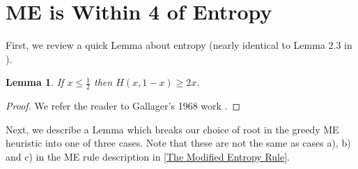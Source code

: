 \documentclass[letterpaper,12pt,titlepage,oneside,final]{book}
\theoremstyle{plain}
\newtheorem{lem}[thm]{Lemma}
\begin{document}
\section{ME is Within 4 of Entropy}

First, we review a quick Lemma about entropy (nearly identical to Lemma 2.3 in \cite{bayer1975improved}).

\begin{lem}\label{entr2x}
If $x \leq \frac{1}{2}$ then $H(x, 1-x) \geq 2x$.
\end{lem}
\begin{proof}
We refer the reader to Gallager's 1968 work \cite{gallager1968information}.
\end{proof}

Next, we describe a Lemma which breaks our choice of root in the greedy ME heuristic into one of three cases. Note that these are not the same as cases a), b) and c) in the ME rule description in \ref{The Modified Entropy Rule}. 
\end{document}
